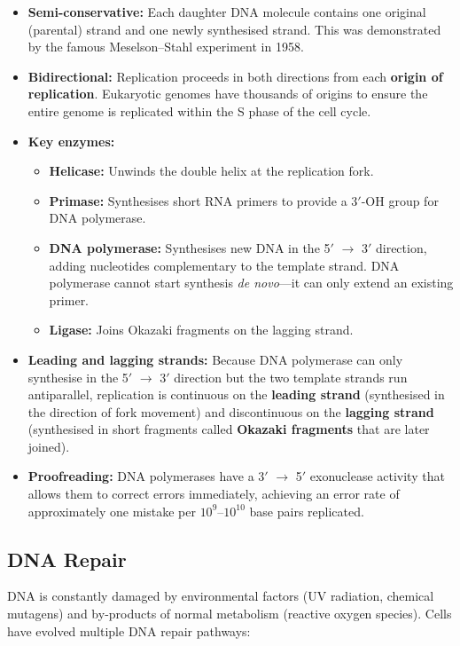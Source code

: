\begin{itemize}[itemsep=2pt]
  \item \textbf{Semi-conservative:} Each daughter DNA molecule contains one original (parental) strand and one newly synthesised strand. This was demonstrated by the famous Meselson--Stahl experiment in 1958.
  \item \textbf{Bidirectional:} Replication proceeds in both directions from each \textbf{origin of replication}. Eukaryotic genomes have thousands of origins to ensure the entire genome is replicated within the S phase of the cell cycle.
  \item \textbf{Key enzymes:}
  \begin{itemize}
    \item \textbf{Helicase:} Unwinds the double helix at the replication fork.
    \item \textbf{Primase:} Synthesises short RNA primers to provide a 3$'${}-OH group for DNA polymerase.
    \item \textbf{DNA polymerase:} Synthesises new DNA in the 5$'${} $\rightarrow$ 3$'${} direction, adding nucleotides complementary to the template strand. DNA polymerase cannot start synthesis \textit{de novo}---it can only extend an existing primer.
    \item \textbf{Ligase:} Joins Okazaki fragments on the lagging strand.
  \end{itemize}
  \item \textbf{Leading and lagging strands:} Because DNA polymerase can only synthesise in the 5$'${} $\rightarrow$ 3$'${} direction but the two template strands run antiparallel, replication is continuous on the \textbf{leading strand} (synthesised in the direction of fork movement) and discontinuous on the \textbf{lagging strand} (synthesised in short fragments called \textbf{Okazaki fragments} that are later joined).
  \item \textbf{Proofreading:} DNA polymerases have a 3$'${} $\rightarrow$ 5$'${} exonuclease activity that allows them to correct errors immediately, achieving an error rate of approximately one mistake per $10^{9}$--$10^{10}$ base pairs replicated.
\end{itemize}

\subsection{DNA Repair}
\label{subsec:molbio:repair}

DNA is constantly damaged by environmental factors (UV radiation, chemical mutagens) and by-products of normal metabolism (reactive oxygen species). Cells have evolved multiple DNA repair pathways:


